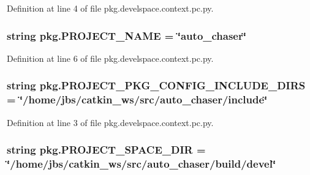 Definition at line 4 of file pkg.\+develspace.\+context.\+pc.\+py.

\subsubsection[{\texorpdfstring{P\+R\+O\+J\+E\+C\+T\+\_\+\+N\+A\+ME}{PROJECT_NAME}}]{\setlength{\rightskip}{0pt plus 5cm}string pkg.\+P\+R\+O\+J\+E\+C\+T\+\_\+\+N\+A\+ME = \char`\"{}auto\+\_\+chaser\char`\"{}}\hypertarget{namespacepkg_a7dfbe99257c26f5e4a3a5483995d9ddc}{}\label{namespacepkg_a7dfbe99257c26f5e4a3a5483995d9ddc}


Definition at line 6 of file pkg.\+develspace.\+context.\+pc.\+py.

\subsubsection[{\texorpdfstring{P\+R\+O\+J\+E\+C\+T\+\_\+\+P\+K\+G\+\_\+\+C\+O\+N\+F\+I\+G\+\_\+\+I\+N\+C\+L\+U\+D\+E\+\_\+\+D\+I\+RS}{PROJECT_PKG_CONFIG_INCLUDE_DIRS}}]{\setlength{\rightskip}{0pt plus 5cm}string pkg.\+P\+R\+O\+J\+E\+C\+T\+\_\+\+P\+K\+G\+\_\+\+C\+O\+N\+F\+I\+G\+\_\+\+I\+N\+C\+L\+U\+D\+E\+\_\+\+D\+I\+RS = \char`\"{}/home/jbs/catkin\+\_\+ws/src/auto\+\_\+chaser/include\char`\"{}}\hypertarget{namespacepkg_a2760bf8266ff58da440f65ee91b203ab}{}\label{namespacepkg_a2760bf8266ff58da440f65ee91b203ab}


Definition at line 3 of file pkg.\+develspace.\+context.\+pc.\+py.

\subsubsection[{\texorpdfstring{P\+R\+O\+J\+E\+C\+T\+\_\+\+S\+P\+A\+C\+E\+\_\+\+D\+IR}{PROJECT_SPACE_DIR}}]{\setlength{\rightskip}{0pt plus 5cm}string pkg.\+P\+R\+O\+J\+E\+C\+T\+\_\+\+S\+P\+A\+C\+E\+\_\+\+D\+IR = \char`\"{}/home/jbs/catkin\+\_\+ws/src/auto\+\_\+chaser/build/devel\char`\"{}}\hypertarget{namespacepkg_a3f0f1b4bc03c596525e025539ca4332f}{}\label{namespacepkg_a3f0f1b4bc03c596525e025539ca4332f}


